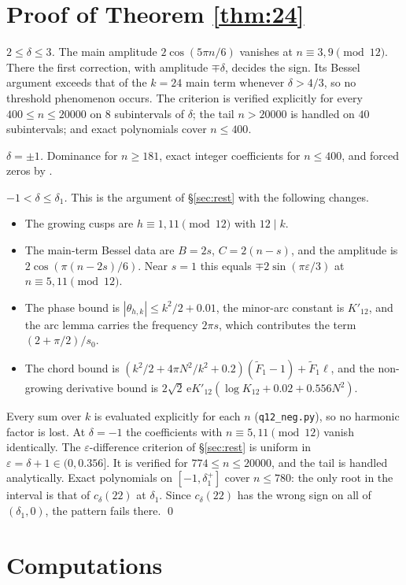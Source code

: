 \documentclass[11pt]{amsart}
\theoremstyle{remark}
\theoremstyle{definition}
\newcommand{\e}{\mathrm e}
\begin{document}
\section{Proof of Theorem \ref{thm:24}}\label{sec:24}
\emph{$2\le\delta\le3$.} The main amplitude $2\cos(5\pi n/6)$ vanishes at $n\equiv3,9\pmod{12}$. There the first correction, with amplitude $\mp\delta$, decides the sign. Its Bessel argument exceeds that of the $k=24$ main term whenever $\delta>4/3$, so no threshold phenomenon occurs. The criterion is verified explicitly for every $400\le n\le20000$ on $8$ subintervals of $\delta$; the tail $n>20000$ is handled on $40$ subintervals; and exact polynomials cover $n\le400$.

\emph{$\delta=\pm1$.} Dominance for $n\ge181$, exact integer coefficients for $n\le400$, and forced zeros by \cite{AB}.

\emph{$-1<\delta\le\delta_1$.} This is the argument of \S\ref{sec:rest} with the following changes.
\begin{itemize}[leftmargin=2em]
\item The growing cusps are $h\equiv1,11\pmod{12}$ with $12\mid k$.
\item The main-term Bessel data are $B=2s$, $C=2(n-s)$, and the amplitude is $2\cos(\pi(n-2s)/6)$. Near $s=1$ this equals $\mp2\sin(\pi\varepsilon/3)$ at $n\equiv5,11\pmod{12}$.
\item The phase bound is $|\theta_{h,k}|\le k^2/2+0.01$, the minor-arc constant is $K'_{12}$, and the arc lemma carries the frequency $2\pi s$, which contributes the term $(2+\pi/2)/s_0$.
\item The chord bound is $(k^2/2+4\pi N^2/k^2+0.2)(\widetilde F_1-1)+\widetilde F_1\ell$, and the non-growing derivative bound is $2\sqrt2\,\e K'_{12}(\log K_{12}+0.02+0.556N^2)$.
\end{itemize}
Every sum over $k$ is evaluated explicitly for each $n$ (\texttt{q12\_neg.py}), so no harmonic factor is lost. At $\delta=-1$ the coefficients with $n\equiv5,11\pmod{12}$ vanish identically. The $\varepsilon$-difference criterion of \S\ref{sec:rest} is uniform in $\varepsilon=\delta+1\in(0,0.356]$. It is verified for $774\le n\le20000$, and the tail is handled analytically. Exact polynomials on $[-1,\delta_1^+]$ cover $n\le780$: the only root in the interval is that of $c_\delta(22)$ at $\delta_1$. Since $c_\delta(22)$ has the wrong sign on all of $(\delta_1,0)$, the pattern fails there. \qed


\section{Computations}\label{sec:computations}
\end{document}
